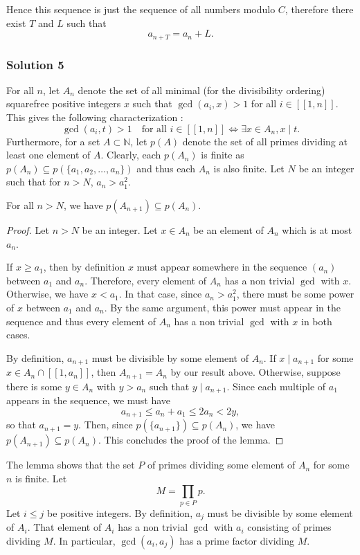 \documentclass[11pt]{article}
\begin{document}
Hence this sequence is just the sequence of all numbers modulo $C$, therefore there exist $T$ and $L$ such that
\[
a_{n+T}=a_n+L.
\]
\newpage
\subsubsection{Solution 5}
For all $n$, let $A_n$ denote the set of all minimal (for the divisibility ordering) squarefree positive integers $x$ such that
$\gcd(a_i,x)>1$ for all $i\in [\![1,n]\!]$. This gives the following characterization :
\[\gcd(a_i,t)>1 \quad \text{for all $i\in [\![1,n]\!]$}\iff \exists x\in A_n, x\mid t.\]Furthermore, for a set $A\subset \mathbb N$, let $p(A)$ denote the set of all primes dividing at least one element of $A$. Clearly, each $p(A_n)$ is finite as $p(A_n)\subseteq p(\{a_1,a_2,\ldots,a_n\})$ and thus each $A_n$ is also finite. Let $N$ be an integer such that for $n>N$, $a_n>a_1^2$.
\begin{claim}
    For all $n>N$, we have $p(A_{n+1})\subseteq p(A_n)$.
\end{claim}
\begin{proof}
    Let $n>N$ be an integer. Let $x\in A_n$ be an element of $A_n$ which is at most $a_n$.

    \medskip
If $x\ge a_1$, then by definition $x$ must appear somewhere in the sequence $(a_n)$ between $a_1$ and $a_n$. Therefore, every element of $A_n$ has a non trivial $\gcd$ with $x$.
Otherwise, we have $x<a_1$. In that case, since $a_n>a_1^2$, there must be some power of $x$ between $a_1$ and $a_n$. By the same argument, this power must appear in the sequence and thus every element of $A_n$ has a non trivial $\gcd$ with $x$ in both cases.

\medskip
By definition, $a_{n+1}$ must be divisible by some element of $A_n$. If $x\mid a_{n+1}$ for some $x\in A_n\cap [\![1,a_n]\!]$, then
$A_{n+1}=A_n$ by our result above.
Otherwise, suppose there is some $y\in A_n$ with $y>a_n$ such that $y\mid a_{n+1}$. Since each multiple of $a_1$ appears in the sequence, we must have
\[a_{n+1}\le a_n+a_1\le 2a_n<2y,\]so that $a_{n+1}=y$. Then, since $p(\{a_{n+1}\})\subseteq p(A_n)$, we have $p(A_{n+1})\subseteq p(A_n)$. This concludes the proof of the lemma. 
\end{proof}
\noindent
The lemma shows that the set $P$ of primes dividing some element of $A_n$ for some $n$ is finite. Let
\[M=\prod_{p\in P}p.\]Let $i\le j$ be positive integers. By definition, $a_j$ must be divisible by some element of $A_i$. That element of $A_i$ has a non trivial $\gcd$ with $a_i$ consisting of primes dividing $M$. In particular, $\gcd(a_i,a_j)$ has a prime factor dividing $M$.
\end{document}
